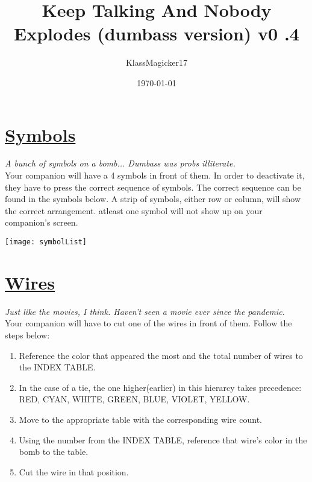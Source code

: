 \documentclass[letterpaper,12pt]{report}
\begin{document}
\title{\textbf{Keep Talking And Nobody Explodes (dumbass version) v0  .4}}
\author{KlassMagicker17}
\date{\today}
\maketitle

\section*{\underline{Symbols}}
\textit{A bunch of symbols on a bomb... Dumbass was probs illiterate.}\\[1cm]
Your companion will have a 4 symbols in front of them. In order to deactivate it,
they have to press the correct sequence of symbols. The correct sequence can be found in the symbols below. A strip of symbols, either row or column, will show the correct arrangement. atleast one symbol will not show up on your companion's screen.
\begin{center}
  \texttt{[image: symbolList]}
\end{center}
\pagebreak

\section*{\underline{Wires}}
\textit{Just like the movies, I think. Haven't seen a movie ever since the pandemic.}\\[1cm]
Your companion will have to cut one of the wires in front of them. Follow the steps below:

\begin{enumerate}
  \item Reference the color that appeared the most and the total number of wires to the INDEX TABLE.
  \item In the case of a tie, the one higher(earlier) in this hierarcy takes precedence: RED, CYAN, WHITE, GREEN, BLUE, VIOLET, YELLOW.
  \item Move to the appropriate table with the corresponding wire count.
  \item Using the number from the INDEX TABLE, reference that wire's color in the bomb to the table.
  \item Cut the wire in that position.
\end{enumerate}
\end{document}
